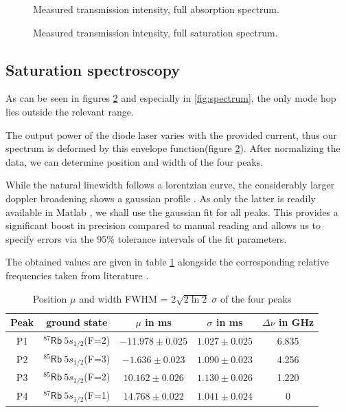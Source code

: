 \begin{figure}[p]
	\centering
	
	\vspace{-2em}
	\caption{Measured transmission intensity, full absorption spectrum.}
	\label{fig:absorption}
	\vspace{-1em}
\end{figure}

\begin{figure}[p]
	\centering
	
	\vspace{-2em}
	\caption{Measured transmission intensity, full saturation spectrum.}
	\label{fig:saturation}
\end{figure}

\newpage
\subsection{Saturation spectroscopy}
As can be seen in figures \ref{fig:saturation} and especially in \ref{fig:spectrum}, the only mode hop lies outside the relevant range.

The output power of the diode laser varies with the provided current, thus our spectrum is deformed by this envelope function(figure \ref{fig:saturation}). After normalizing the data, we can determine position and width of the four peaks.

While the natural linewidth follows a lorentzian curve, the considerably larger doppler broadening shows a gaussian profile \cite{lit:SAS}. As only the latter is readily available in Matlab \cite{lit:fittypes}, we shall use the gaussian fit for all peaks. This provides a significant boost in precision compared to manual reading and allows us to specify errors via the 95\% tolerance intervals of the fit parameters.

The obtained values are given in table \ref{tab:raw} alongside the corresponding relative frequencies taken from literature \cite{lit:Rb85, lit:Rb87}.

\begin{table}[h]
 \centering
 \caption{Position $\mu$ and width FWHM = $2 \sqrt{2 \ln 2} \; \sigma$ of the four peaks}
 \label{tab:raw}
 \begin{tabular}{ccccc}
  \toprule
  Peak	& ground state 	& $\mu$ in ms 		& $\sigma$ in ms 		& $\Delta \nu$ in GHz	\\
  \midrule
  P1		& $^{87}\mathsf{Rb}~5s_{1/2}$(F=2)	& $-11.978 \pm 0.025$	& $1.027 \pm 0.025$ 	& 6.835		\\
  P2		& $^{85}\mathsf{Rb}~5s_{1/2}$(F=3)	& $-1.636 \pm 0.023$	& $1.090 \pm 0.023$ 	& 4.256		\\
  P3		& $^{85}\mathsf{Rb}~5s_{1/2}$(F=2)	& $10.162 \pm 0.026$	& $1.130 \pm 0.026$ 	& 1.220		\\
  P4		& $^{87}\mathsf{Rb}~5s_{1/2}$(F=1)	& $14.768 \pm 0.022$	& $1.041 \pm 0.024$ 	& 0			\\
  \bottomrule
 \end{tabular}
\end{table}

